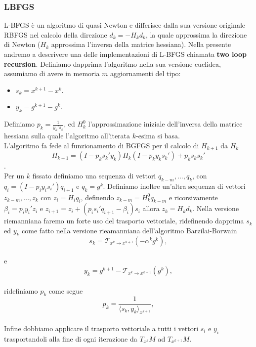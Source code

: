 \documentclass[a4paper, 12pt]{article}
\begin{document}
\subsubsection{LBFGS}
L-BFGS è un algoritmo di quasi Newton e differisce dalla sua versione originale RBFGS nel calcolo della direzione $d_k = -H_kd_k$, la quale approssima la direzione di Newton ($H_k$ approssima l'inversa della matrice hessiana). Nella presente andremo a descrivere una delle implementazioni di L-BFGS chiamata \textbf{two loop recursion}. Definiamo dapprima l'algoritmo nella sua versione euclidea, assumiamo di avere in memoria $m$ aggiornamenti del tipo:\\
\begin{itemize}
    \item $s_k = x^{k+1} - x^k$.
    \item $y_k = g^{k+1} - g^k$.
\end{itemize}
Definiamo $p_k = \frac{1}{y_k's_k}$, ed $H_k^0$ l'approssimazione iniziale dell'inversa della matrice hessiana sulla quale l'algoritmo all'iterata $k$-esima si basa.\\
L'algoritmo fa fede al funzionamento di BGFGS per il calcolo di $H_{k+1}$ da $H_k$\\
\[H_{k+1} = (I - p_ks_k'y_k)H_k(I - p_ky_ks_k') + p_ks_ks_k'\].\\
Per un $k$ fissato definiamo una sequenza di vettori $q_{k-m}, ..., q_k$, con $q_i = (I - p_iy_is_i')q_{i+1}$ e $q_k = g^k$. Definiamo inoltre un'altra sequenza di vettori $z_{k-m}, ..., z_k$ con $z_i = H_iq_i$, definendo $z_{k-m} = H_k^0q_{k-m}$ e ricorsivamente $\beta_i = p_iy_i'z_i$ e $z_{i+1} = z_i + (p_is_i'q_{i+1} - \beta_i)s_i$ allora $z_k = H_kd_k$.
Nella versione riemanniana faremo un forte uso del trasporto vettoriale, ridefinendo dapprima $s_k$ ed $y_k$ come fatto nella versione rieamanniana dell'algoritmo Barzilai-Borwain\\
\[s_k = \mathcal{T}_{x^k \to x^{k+1}}(-\alpha^kg^k),\]\\
e\\
\[y_k = g^{k+1} - \mathcal{T}_{x^k \to x^{k+1}}(g^k),\]\\
ridefiniamo $p_k$ come segue\\
\[p_k = \frac{1}{\langle s_k,y_k \rangle_{x^{k+1}}},\]\\
Infine dobbiamo applicare il trasporto vettoriale a tutti i vettori $s_i$ e $y_i$ trasportandoli alla fine di ogni iterazione da $T_{x^k}M$ ad $T_{x^{k+1}}M$.\\
\end{document}
